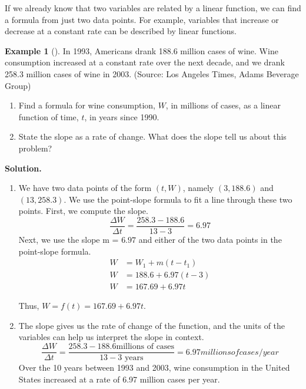 \documentclass[10pt,]{book}
\theoremstyle{plain}
\theoremstyle{definition}
\theoremstyle{definition}
\newtheorem{example}[theorem]{Example}
\theoremstyle{definition}
\theoremstyle{definition}
\numberwithin{equation}{section}
\newcommand{\amp}{ & }
\begin{document}
    If we already know that two variables are related by a linear function, we can find a formula from just two data points. For example, variables that increase or decrease at a constant rate can be described by linear functions.
%
\begin{example}[]\label{example-wine}
In 1993, Americans drank 188.6 million cases of wine. Wine consumption increased at a constant rate over the next decade, and we drank 258.3 million cases of wine in 2003. (Source: Los Angeles Times, Adams Beverage Group)%
\leavevmode%
\begin{enumerate}[label=*\alph**]
\item\hypertarget{li-181}{}Find a formula for wine consumption, \(W\), in millions of cases, as a linear function of time, \(t\), in years since 1990.\item\hypertarget{li-182}{}State the slope as a rate of change. What does the slope tell us about this problem?\end{enumerate}
\par\medskip\noindent%
\textbf{Solution.}\quad \leavevmode%
\begin{enumerate}[label=*\alph**]
\item\hypertarget{li-183}{}We have two data points of the form \((t, W)\), namely \((3, 188.6)\) and \((13, 258.3)\). We use the point-slope formula to fit a line through these two points. First, we compute the slope.
        \begin{equation*}\frac{\Delta W}{\Delta t}=\frac {258.3 − 188.6}{13 − 3}= 6.97\end{equation*}
        Next, we use the slope m = \(6.97\) and either of the two data points in the point-slope formula.
        \begin{align*}
            W \amp =W_1 + m(t − t_1) \\
            W \amp = 188.6 + 6.97(t − 3) \\
            W \amp = 167.69 + 6.97t
        \end{align*}

        Thus, \(W = f (t) = 167.69 + 6.97t\).
        \item\hypertarget{li-184}{}The slope gives us the rate of change of the function, and the units of the variables can help us interpret the slope in context.
        \begin{equation*}\frac{\Delta W}{\Delta t}= 
            \frac{258.3 − 188.6 \text{millions of cases}}{13 − 3\text{ years}}
                = 6.97 millions of cases /year
        \end{equation*}
        Over the 10 years between 1993 and 2003, wine consumption in the United States increased at a rate of 6.97 million cases per year.\end{enumerate}
\end{example}
\end{document}
